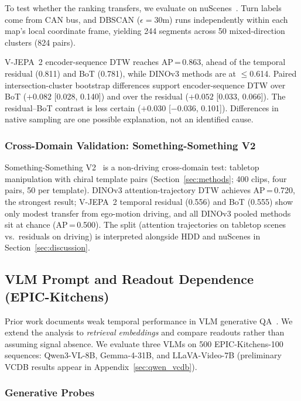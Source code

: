 \documentclass{article}
\theoremstyle{remark}
\begin{document}
To test whether the ranking transfers, we evaluate on nuScenes~\cite{nuscenes}. Turn labels come from CAN bus, and DBSCAN ($\epsilon\!=\!30$m) runs independently within each map's local coordinate frame, yielding 244 segments across 50 mixed-direction clusters (824 pairs).

V-JEPA~2 encoder-sequence DTW reaches AP\,=\,0.863, ahead of the temporal residual (0.811) and BoT (0.781), while DINOv3 methods are at $\leq$0.614. Paired intersection-cluster bootstrap differences support encoder-sequence DTW over BoT ($+0.082$ [0.028, 0.140]) and over the residual ($+0.052$ [0.033, 0.066]). The residual--BoT contrast is less certain ($+0.030$ [$-0.036$, 0.101]). Differences in native sampling are one possible explanation, not an identified cause.

\subsubsection{Cross-Domain Validation: Something-Something V2}
\label{sec:ssv2}

Something-Something V2~\cite{ssv2} is a non-driving cross-domain test: tabletop manipulation with chiral template pairs (Section~\ref{sec:methods}; 400 clips, four pairs, 50 per template). DINOv3 attention-trajectory DTW achieves AP\,=\,0.720, the strongest result; V-JEPA~2 temporal residual (0.556) and BoT (0.555) show only modest transfer from ego-motion driving, and all DINOv3 pooled methods sit at chance (AP\,=\,0.500). The split (attention trajectories on tabletop scenes vs.\ residuals on driving) is interpreted alongside HDD and nuScenes in Section~\ref{sec:discussion}.

\subsection{VLM Prompt and Readout Dependence (EPIC-Kitchens)}

Prior work documents weak temporal performance in VLM generative QA~\cite{tomato,temporalbench,tempcompass,infact,videozerobench}. We extend the analysis to \emph{retrieval embeddings} and compare readouts rather than assuming signal absence. We evaluate three VLMs on 500 EPIC-Kitchens-100~\cite{epickitchens} sequences: Qwen3-VL-8B, Gemma-4-31B, and LLaVA-Video-7B (preliminary VCDB results appear in Appendix~\ref{sec:qwen_vcdb}).

\subsubsection{Generative Probes}
\label{sec:vlm_generative}
\end{document}
